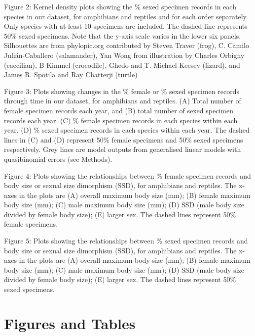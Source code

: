 \documentclass[a4paper, 12pt]{article}
\begin{document}
Figure 2: Kernel density plots showing the \% sexed specimen records in each species in our dataset, for amphibians and reptiles and for each order separately. Only species with at least 10 specimens are included. The dashed line represents 50\% sexed specimens. Note that the y-axis scale varies in the lower six panels. Silhouettes are from phylopic.org contributed by Steven Traver (frog), C. Camilo Julián-Caballero (salamander), Yan Wong from illustration by Charles Orbigny (caecilian), B Kimmel (crocodile), Ghedo and T. Michael Keesey (lizard), and James R. Spotila and Ray Chatterji (turtle)

Figure 3: Plots showing changes in the \% female or \% sexed specimen records through time in our dataset, for amphibians and reptiles. (A) Total number of female specimen records each year, and (B) total number of sexed specimen records each year. (C) \% female specimen records in each species within each year. (D) \% sexed specimen records in each species within each year. The dashed lines in (C) and (D) represent 50\% female specimens and 50\% sexed specimens respectively. Grey lines are model outputs from generalised linear models with quasibinomial errors (see Methods).

Figure 4: Plots showing the relationships between \% female specimen records and body size or sexual size dimorphism (SSD), for amphibians and reptiles. The x-axes in the plots are (A) overall maximum body size (mm); (B) female maximum body size (mm); (C) male maximum body size (mm); (D) SSD (male body size divided by female body size); (E) larger sex. The dashed lines represent 50\% female specimens.

Figure 5: Plots showing the relationships between \% sexed specimen records and body size or sexual size dimorphism (SSD), for amphibians and reptiles. The x-axes in the plots are (A) overall maximum body size (mm); (B) female maximum body size (mm); (C) male maximum body size (mm); (D) SSD (male body size divided by female body size); (E) larger sex. The dashed lines represent 50\% sexed specimens. 

\newpage
\section{Figures and Tables}

\begin{landscape}

\end{landscape}
\end{document}
